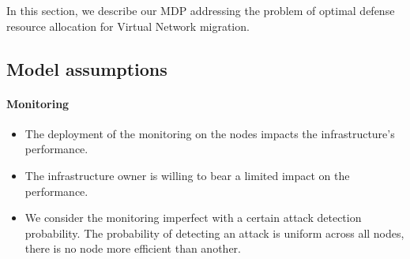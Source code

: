 \label{sec:mdp-model}
In this section, we describe our MDP addressing the problem of optimal defense resource allocation for Virtual Network migration.

\subsection{Model assumptions}
\label{sec:mdp-model-assumption}

\paragraph{Monitoring}
\begin{itemize}
    \item The deployment of the monitoring on the nodes impacts the infrastructure's performance. 
    
    \item The infrastructure owner is willing to bear a limited impact on the performance.
    
    \item We consider the monitoring imperfect with a certain attack detection probability.
    The probability of detecting an attack is uniform across all nodes, \ie there is no node more efficient than another. 
\end{itemize}


